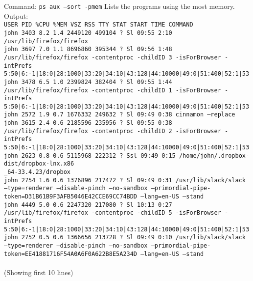 \documentclass[11pt]{article}
\begin{document}
\begin{enumerate}
Command:  {\tt ps aux --sort -pmem} \hspace{1cm} Lists the programs using the most memory. \\ 
Output:\\
{\tt USER       PID \%CPU \%MEM    VSZ   RSS TTY      STAT START   TIME COMMAND\\
john      3403  8.2  1.4 2449120 499104 ?      Sl   09:55   2:10 /usr/lib/firefox/firefox\\
john      3697  7.0  1.1 8696860 395344 ?      Sl   09:56   1:48 /usr/lib/firefox/firefox -contentproc -childID 3 -isForBrowser -intPrefs 5:50|6:-1|18:0|28:1000|33:20|34:10|43:128|44:10000|49:0|51:400|52:1|53\\
john      3478  6.5  1.0 2399824 382404 ?      Sl   09:55   1:44 /usr/lib/firefox/firefox -contentproc -childID 1 -isForBrowser -intPrefs 5:50|6:-1|18:0|28:1000|33:20|34:10|43:128|44:10000|49:0|51:400|52:1|53\\
john      2572  1.9  0.7 1676332 249632 ?      Sl   09:49   0:38 cinnamon --replace\\
john      3615  2.4  0.6 2185596 235956 ?      Sl   09:55   0:38 /usr/lib/firefox/firefox -contentproc -childID 2 -isForBrowser -intPrefs 5:50|6:-1|18:0|28:1000|33:20|34:10|43:128|44:10000|49:0|51:400|52:1|53\\
john      2623  0.8  0.6 5115968 222312 ?      Ssl  09:49   0:15 /home/john/.dropbox-dist/dropbox-lnx.x86\\\_64-33.4.23/dropbox\\
john      2754  1.6  0.6 1376896 217472 ?      Sl   09:49   0:31 /usr/lib/slack/slack --type=renderer --disable-pinch --no-sandbox --primordial-pipe-token=D31B61B9F3AFB5046E42CCE69CC74BDD --lang=en-US --stand\\
john      4449  5.0  0.6 2247320 217080 ?      Sl   10:13   0:27 /usr/lib/firefox/firefox -contentproc -childID 5 -isForBrowser -intPrefs 5:50|6:-1|18:0|28:1000|33:20|34:10|43:128|44:10000|49:0|51:400|52:1|53\\
john      2752  0.5  0.6 1366656 213728 ?      Sl   09:49   0:10 /usr/lib/slack/slack --type=renderer --disable-pinch --no-sandbox --primordial-pipe-token=EE41881716F54A0A6F0A622B8E5A234D --lang=en-US --stand\\
}\\
(Showing first 10 lines)
\end{enumerate}

 
\end{document}
